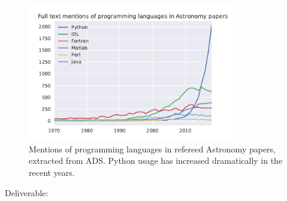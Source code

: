 \begin{task}[
  title=Astronomy application,
  id=astro,
  lead=CDS,
  PM=18,
  wphases={0-48},
  partners={CDS,QS,WTT,SRL}
]
\begin{figure}[ht]\centering
  \includegraphics[width=0.8\textwidth]{python-astro-citations}
  \caption{Mentions of programming languages in refereed Astronomy papers, extracted from ADS. Python usage has increased dramatically in the recent years.}\label{fig:python-astro-citations}
\end{figure}

Deliverable: 


\end{task}
